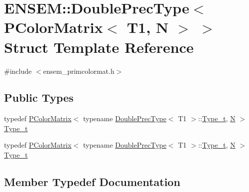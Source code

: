 \hypertarget{structENSEM_1_1DoublePrecType_3_01PColorMatrix_3_01T1_00_01N_01_4_01_4}{}\section{E\+N\+S\+EM\+:\+:Double\+Prec\+Type$<$ P\+Color\+Matrix$<$ T1, N $>$ $>$ Struct Template Reference}
\label{structENSEM_1_1DoublePrecType_3_01PColorMatrix_3_01T1_00_01N_01_4_01_4}


{\ttfamily \#include $<$ensem\+\_\+primcolormat.\+h$>$}

\subsection*{Public Types}
\begin{DoxyCompactItemize}
\item 
typedef \mbox{\hyperlink{classENSEM_1_1PColorMatrix}{P\+Color\+Matrix}}$<$ typename \mbox{\hyperlink{structENSEM_1_1DoublePrecType}{Double\+Prec\+Type}}$<$ T1 $>$\+::\mbox{\hyperlink{structENSEM_1_1DoublePrecType_3_01PColorMatrix_3_01T1_00_01N_01_4_01_4_ad34f205ddad59c047cf49ac9972cdaeb}{Type\+\_\+t}}, \mbox{\hyperlink{operator__name__util_8cc_a7722c8ecbb62d99aee7ce68b1752f337}{N}} $>$ \mbox{\hyperlink{structENSEM_1_1DoublePrecType_3_01PColorMatrix_3_01T1_00_01N_01_4_01_4_ad34f205ddad59c047cf49ac9972cdaeb}{Type\+\_\+t}}
\item 
typedef \mbox{\hyperlink{classENSEM_1_1PColorMatrix}{P\+Color\+Matrix}}$<$ typename \mbox{\hyperlink{structENSEM_1_1DoublePrecType}{Double\+Prec\+Type}}$<$ T1 $>$\+::\mbox{\hyperlink{structENSEM_1_1DoublePrecType_3_01PColorMatrix_3_01T1_00_01N_01_4_01_4_ad34f205ddad59c047cf49ac9972cdaeb}{Type\+\_\+t}}, \mbox{\hyperlink{operator__name__util_8cc_a7722c8ecbb62d99aee7ce68b1752f337}{N}} $>$ \mbox{\hyperlink{structENSEM_1_1DoublePrecType_3_01PColorMatrix_3_01T1_00_01N_01_4_01_4_ad34f205ddad59c047cf49ac9972cdaeb}{Type\+\_\+t}}
\end{DoxyCompactItemize}


\subsection{Member Typedef Documentation}
\mbox{\label{structENSEM_1_1DoublePrecType_3_01PColorMatrix_3_01T1_00_01N_01_4_01_4_ad34f205ddad59c047cf49ac9972cdaeb}} 
